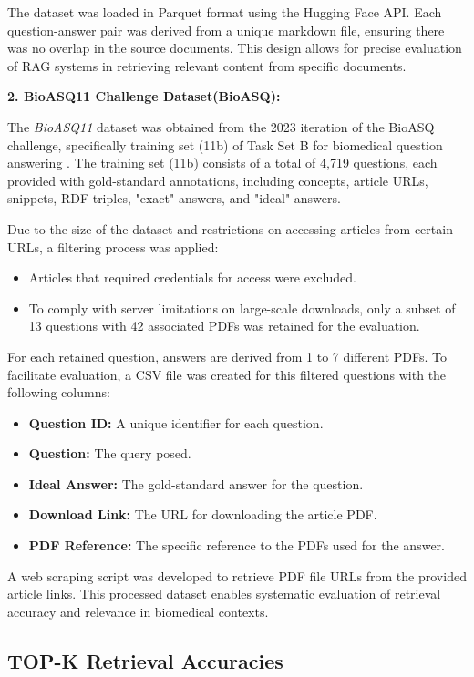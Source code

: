 \documentclass{scrartcl}
\begin{document}
The dataset was loaded in Parquet format using the Hugging Face API. Each question-answer pair was derived from a unique markdown file, ensuring there was no overlap in the source documents. This design allows for precise evaluation of RAG systems in retrieving relevant content from specific documents.

\textbf{2. BioASQ11 Challenge Dataset(BioASQ):}

The \textit{BioASQ11} dataset was obtained from the 2023 iteration of the BioASQ challenge, specifically training set (11b) of Task Set B for biomedical question answering \cite{bioasq2023}. The training set (11b) consists of a total of 4,719 questions, each provided with gold-standard annotations, including concepts, article URLs, snippets, RDF triples, "exact" answers, and "ideal" answers.

Due to the size of the dataset and restrictions on accessing articles from certain URLs, a filtering process was applied:
\begin{itemize}
    \item Articles that required credentials for access were excluded.
    \item To comply with server limitations on large-scale downloads, only a subset of 13 questions with 42 associated PDFs was retained for the evaluation.
\end{itemize}

For each retained question, answers are derived from 1 to 7 different PDFs. To facilitate evaluation, a CSV file was created for this filtered questions with the following columns:
\begin{itemize}
    \item \textbf{Question ID:} A unique identifier for each question.
    \item \textbf{Question:} The query posed.
    \item \textbf{Ideal Answer:} The gold-standard answer for the question.
    \item \textbf{Download Link:} The URL for downloading the article PDF.
    \item \textbf{PDF Reference:} The specific reference to the PDFs used for the answer.
\end{itemize}

A web scraping script was developed to retrieve PDF file URLs from the provided article links. This processed dataset enables systematic evaluation of retrieval accuracy and relevance in biomedical contexts.

\subsection{TOP-K Retrieval Accuracies}
\end{document}
